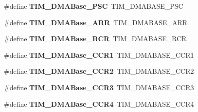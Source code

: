 \begin{DoxyCompactItemize}
\item 
\#define {\bfseries T\+I\+M\+\_\+\+D\+M\+A\+Base\+\_\+\+P\+SC}~T\+I\+M\+\_\+\+D\+M\+A\+B\+A\+S\+E\+\_\+\+P\+SC\hypertarget{group___h_a_l___t_i_m___aliased___defines_gab8dd06970f235fe9f6997e0975237388}{}\label{group___h_a_l___t_i_m___aliased___defines_gab8dd06970f235fe9f6997e0975237388}

\item 
\#define {\bfseries T\+I\+M\+\_\+\+D\+M\+A\+Base\+\_\+\+A\+RR}~T\+I\+M\+\_\+\+D\+M\+A\+B\+A\+S\+E\+\_\+\+A\+RR\hypertarget{group___h_a_l___t_i_m___aliased___defines_gaab8a66f70e59b5916b4bba344746d652}{}\label{group___h_a_l___t_i_m___aliased___defines_gaab8a66f70e59b5916b4bba344746d652}

\item 
\#define {\bfseries T\+I\+M\+\_\+\+D\+M\+A\+Base\+\_\+\+R\+CR}~T\+I\+M\+\_\+\+D\+M\+A\+B\+A\+S\+E\+\_\+\+R\+CR\hypertarget{group___h_a_l___t_i_m___aliased___defines_ga97f9edceee5c99b32aaa2c6daf849b7d}{}\label{group___h_a_l___t_i_m___aliased___defines_ga97f9edceee5c99b32aaa2c6daf849b7d}

\item 
\#define {\bfseries T\+I\+M\+\_\+\+D\+M\+A\+Base\+\_\+\+C\+C\+R1}~T\+I\+M\+\_\+\+D\+M\+A\+B\+A\+S\+E\+\_\+\+C\+C\+R1\hypertarget{group___h_a_l___t_i_m___aliased___defines_ga235a47fa47fd19594a111e6e48c0d5a2}{}\label{group___h_a_l___t_i_m___aliased___defines_ga235a47fa47fd19594a111e6e48c0d5a2}

\item 
\#define {\bfseries T\+I\+M\+\_\+\+D\+M\+A\+Base\+\_\+\+C\+C\+R2}~T\+I\+M\+\_\+\+D\+M\+A\+B\+A\+S\+E\+\_\+\+C\+C\+R2\hypertarget{group___h_a_l___t_i_m___aliased___defines_ga0e2150dcd3afe31ecb793aa471b3b972}{}\label{group___h_a_l___t_i_m___aliased___defines_ga0e2150dcd3afe31ecb793aa471b3b972}

\item 
\#define {\bfseries T\+I\+M\+\_\+\+D\+M\+A\+Base\+\_\+\+C\+C\+R3}~T\+I\+M\+\_\+\+D\+M\+A\+B\+A\+S\+E\+\_\+\+C\+C\+R3\hypertarget{group___h_a_l___t_i_m___aliased___defines_ga590c90085bd2b206b941dff2731fed74}{}\label{group___h_a_l___t_i_m___aliased___defines_ga590c90085bd2b206b941dff2731fed74}

\item 
\#define {\bfseries T\+I\+M\+\_\+\+D\+M\+A\+Base\+\_\+\+C\+C\+R4}~T\+I\+M\+\_\+\+D\+M\+A\+B\+A\+S\+E\+\_\+\+C\+C\+R4\hypertarget{group___h_a_l___t_i_m___aliased___defines_ga5e84a16e7d8ea369a3a55bb6fe1f2171}{}\label{group___h_a_l___t_i_m___aliased___defines_ga5e84a16e7d8ea369a3a55bb6fe1f2171}


\end{DoxyCompactItemize}
